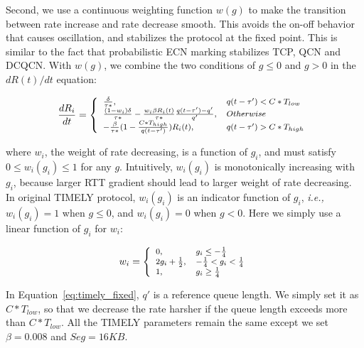 Second, we use a continuous weighting function $w(g)$ to make the transition between rate increase and rate decrease
smooth. This avoids the on-off behavior that causes oscillation, and stabilizes the protocol at the fixed point. 
This is similar to the fact that probabilistic ECN marking stabilizes TCP, QCN and DCQCN. With $w(g)$, we combine 
the two conditions of $g \le 0$ and $g>0$ in the $dR(t)/dt$ equation:


\begin{equation}
\small
\frac{{dR_i}}{{dt}} = \left\{ \begin{array}{ll}
\frac{\delta }{{\tau *}}, & q(t - \tau ') < C*{T_{low}}\\
\frac{{(1 - {w_i})\delta }}{{\tau *}} - \frac{{{w_i}\beta {R_i}(t)}}{{\tau *}}\frac{{q(t - \tau ') - q'}}{{q'}}, & Otherwise\\
 - \frac{\beta }{{\tau *}}(1 - \frac{{C*{T_{high}}}}{{q(t - \tau ')}})R_i(t), & q(t - \tau ') > C*{T_{high}}
\end{array} \right.\\
\label{eq:timely_fixed}
\end{equation}

where $w_i$, the weight of rate decreasing, is a function of $g_i$, and must satisfy $0 \le w_i(g_i) \le 1$ for any $g$. 
Intuitively, $w_i(g_i)$ is monotonically increasing with $g_i$, because larger RTT gradient should lead to larger 
weight of rate decreasing. In original TIMELY protocol, $w_i(g_i)$ is an indicator function of $g_i$, {\em i.e.,} 
$w_i(g_i)=1$ when $g \le 0$, and $w_i(g_i)=0$ when $g<0$. Here we simply use a linear function of $g_i$ for $w_i$:

\begin{equation}
\small
{w_i} = \left\{ \begin{array}{ll}
0, & {g_i \le  - \frac{1}{4}} \\
2{g_i} + \frac{1}{2}, & { - \frac{1}{4} < g_i < \frac{1}{4}} \\
1, & {g_i \ge \frac{1}{4}}
\end{array} \right.
\end{equation}

In Equation~\ref{eq:timely_fixed}, $q'$ is a reference queue length. We simply set it as $C*T_{low}$, 
so that we decrease the rate harsher if the queue length exceeds more than $C*T_{low}$. All the TIMELY
parameters remain the same except we set $\beta=0.008$ and $Seg=16KB$. 

